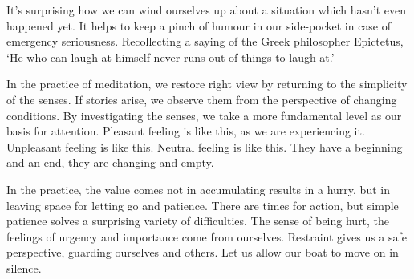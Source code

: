
It's surprising how we can wind ourselves up about a situation which
hasn't even happened yet. It helps to keep a pinch of humour in our
side-pocket in case of emergency seriousness. Recollecting a saying of
the Greek philosopher Epictetus, `He who can laugh at himself never runs
out of things to laugh at.'


In the practice of meditation, we restore right view by returning to the
simplicity of the senses. If stories arise, we observe them from the
perspective of changing conditions. By investigating the senses, we take
a more fundamental level as our basis for attention. Pleasant feeling is
like this, as we are experiencing it. Unpleasant feeling is like this.
Neutral feeling is like this. They have a beginning and an end, they are
changing and empty.

In the practice, the value comes not in accumulating results in a hurry,
but in leaving space for letting go and patience. There are times for
action, but simple patience solves a surprising variety of difficulties.
The sense of being hurt, the feelings of urgency and importance come
from ourselves. Restraint gives us a safe perspective, guarding
ourselves and others. Let us allow our boat to move on in silence.
